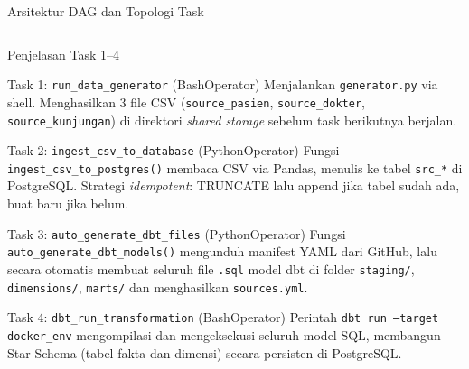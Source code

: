 \documentclass[xcolor=table,t,aspectratio=169]{beamer}
\begin{document}
\begin{frame}{Arsitektur DAG dan Topologi Task}
\begin{columns}[T]
  \end{columns}
\end{frame}

\begin{frame}{Penjelasan Task 1--4}
  \footnotesize
  \begin{block}{Task 1: \texttt{run\_data\_generator} (BashOperator)}
    \scriptsize Menjalankan \texttt{generator.py} via shell. Menghasilkan 3 file CSV (\texttt{source\_pasien}, \texttt{source\_dokter}, \texttt{source\_kunjungan}) di direktori \textit{shared storage} sebelum task berikutnya berjalan.
  \end{block}
  \vspace{3pt}
  \begin{block}{Task 2: \texttt{ingest\_csv\_to\_database} (PythonOperator)}
    \scriptsize Fungsi \texttt{ingest\_csv\_to\_postgres()} membaca CSV via Pandas, menulis ke tabel \texttt{src\_*} di PostgreSQL. Strategi \textit{idempotent}: TRUNCATE lalu append jika tabel sudah ada, buat baru jika belum.
  \end{block}
  \vspace{3pt}
  \begin{block}{Task 3: \texttt{auto\_generate\_dbt\_files} (PythonOperator)}
    \scriptsize Fungsi \texttt{auto\_generate\_dbt\_models()} mengunduh manifest YAML dari GitHub, lalu secara otomatis membuat seluruh file \texttt{.sql} model dbt di folder \texttt{staging/}, \texttt{dimensions/}, \texttt{marts/} dan menghasilkan \texttt{sources.yml}.
  \end{block}
  \vspace{3pt}
  \begin{block}{Task 4: \texttt{dbt\_run\_transformation} (BashOperator)}
    \scriptsize Perintah \texttt{dbt run --target docker\_env} mengompilasi dan mengeksekusi seluruh model SQL, membangun Star Schema (tabel fakta dan dimensi) secara persisten di PostgreSQL.
  \end{block}
\end{frame}
\end{document}
